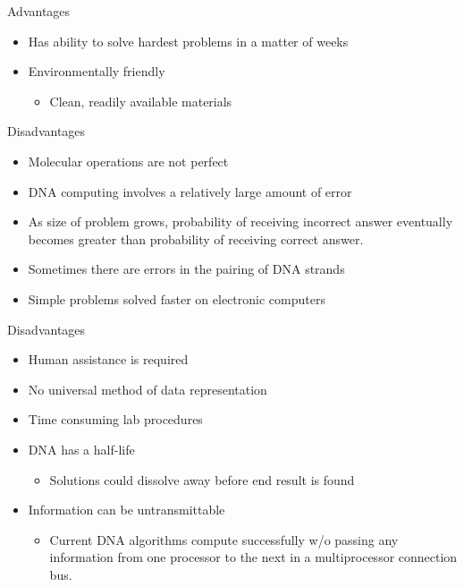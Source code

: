 \documentclass[10pt]{beamer}
\begin{document}
\begin{frame}{Advantages}
  \begin{itemize}
    \item {Has ability to solve hardest problems in a matter of weeks}
        \item {Environmentally friendly
          \begin{itemize}
        \item{Clean, readily available materials}
      \end{itemize}
            }
  \end{itemize}
\end{frame}

\begin{frame}{Disadvantages}
  \begin{itemize}
    \item {Molecular operations are not perfect}
    \item {DNA computing involves a relatively large amount of error}
    \item {As size of problem grows, probability of receiving incorrect answer eventually becomes greater than probability of receiving correct answer.}
    \item {Sometimes there are errors in the pairing of DNA strands}
        \item {Simple problems solved faster on electronic computers}
  \end{itemize}
\end{frame}

\begin{frame}{Disadvantages}
  \begin{itemize}
    \item {Human assistance is required}
    \item {No universal method of data representation}
    \item {Time consuming lab procedures}
        \item {DNA has a half-life
          \begin{itemize}
        \item{Solutions could dissolve away before end result is found}
      \end{itemize}
            }
        \item {Information can be untransmittable
          \begin{itemize}
        \item{Current DNA algorithms compute successfully w/o passing any information from one processor to the next in a multiprocessor connection bus.}
      \end{itemize}
            }
  \end{itemize}
\end{frame}
\end{document}
